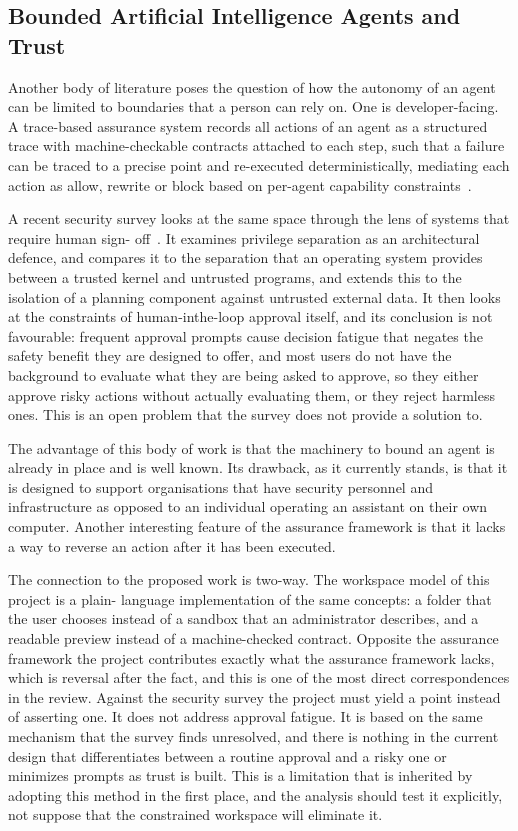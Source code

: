 \documentclass{FastFyp}
\begin{document}
\subsection{Bounded Artificial Intelligence Agents and Trust}
Another body of literature poses the question of how the autonomy of an agent can be limited to boundaries that a person can rely on. One is developer-facing. A trace-based assurance system records all actions of an agent as a structured trace with machine-checkable contracts attached to each step, such that a failure can be traced to a precise point and re-executed deterministically, mediating each action as allow, rewrite or block based on per-agent capability constraints~\cite{ref:paduraru2026}.

A recent security survey looks at the same space through the lens of systems that require human sign- off~\cite{ref:kim2026}. It examines privilege separation as an architectural defence, and compares it to the separation that an operating system provides between a trusted kernel and untrusted programs, and extends this to the isolation of a planning component against untrusted external data. It then looks at the constraints of human-inthe-loop approval itself, and its conclusion is not favourable: frequent approval prompts cause decision fatigue that negates the safety benefit they are designed to offer, and most users do not have the background to evaluate what they are being asked to approve, so they either approve risky actions without actually evaluating them, or they reject harmless ones. This is an open problem that the survey does not provide a solution to.

The advantage of this body of work is that the machinery to bound an agent is already in place and is well known. Its drawback, as it currently stands, is that it is designed to support organisations that have security personnel and infrastructure as opposed to an individual operating an assistant on their own computer. Another interesting feature of the assurance framework is that it lacks a way to reverse an action after it has been executed.

The connection to the proposed work is two-way. The workspace model of this project is a plain- language implementation of the same concepts: a folder that the user chooses instead of a sandbox that an administrator describes, and a readable preview instead of a machine-checked contract. Opposite the assurance framework the project contributes exactly what the assurance framework lacks, which is reversal after the fact, and this is one of the most direct correspondences in the review. Against the security survey the project must yield a point instead of asserting one. It does not address approval fatigue. It is based on the same mechanism that the survey finds unresolved, and there is nothing in the current design that differentiates between a routine approval and a risky one or minimizes prompts as trust is built. This is a limitation that is inherited by adopting this method in the first place, and the analysis should test it explicitly, not suppose that the constrained workspace will eliminate it.
\end{document}
